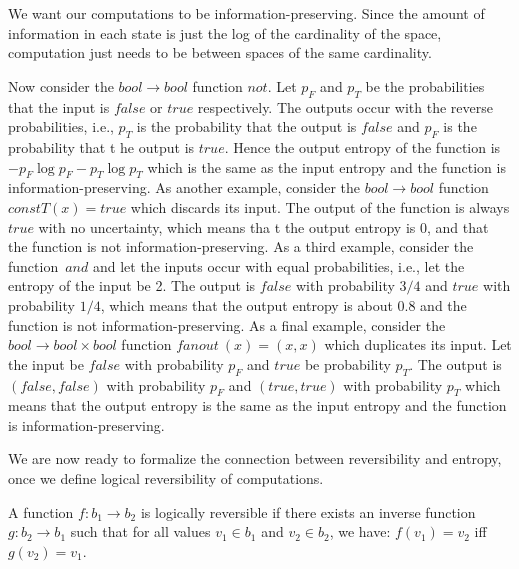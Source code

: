 We want our computations to be information-preserving. Since the
amount of information in each state is just the log of the cardinality
of the space, computation just needs to be between spaces of the same
cardinality. 

 Now consider the \ensuremath{\mathit{bool} \rightarrow \mathit{bool}}
function \ensuremath{\mathit{not}}. Let $p_F$ and $p_T$ be the
probabilities that the input is \ensuremath{\mathit{false}} or
\ensuremath{\mathit{true}} respectively. The outputs occur with the
reverse probabilities, i.e., $p_T$ is the probability that the output
is \ensuremath{\mathit{false}} and $p_F$ is the probability that t he
output is \ensuremath{\mathit{true}}. Hence the output entropy of the
function is $- p_F \log{p_F} - p_T \log{p_T}$ which is the same as the
input entropy and the function is information-preserving. As another
example, consider the \ensuremath{\mathit{bool} \rightarrow
  \mathit{bool}} function \ensuremath{\mathit{constT}(x) =
  \mathit{true}} which discards its input.  The output of the function
is always \ensuremath{\mathit{true}} with no uncertainty, which means
tha t the output entropy is 0, and that the function is not
information-preserving. As a third example, consider the
function~\ensuremath{\mathit{and}} and let the inputs occur with equal
probabilities, i.e., let the entropy of the input be 2. The output is
\ensuremath{\mathit{false}} with probability $3/4$ and
\ensuremath{\mathit{true}} with probability $1/4$, which means that
the output entropy is about 0.8 and the function is not
information-preserving. As a final example, consider the
\ensuremath{\mathit{bool} \rightarrow \mathit{bool}\times
  \mathit{bool}} function \ensuremath{\mathit{fanout} ~(x) = (x,x)}
which duplicates its input.  Let the input be
\ensuremath{\mathit{false}} with probability $p_F$ and
\ensuremath{\mathit{true}} be probability $p_T$. The output is
\ensuremath{(\mathit{false},\mathit{false})} with probability $p_F$
and \ensuremath{(\mathit{true},\mathit{true})} with probability $p_T$
which means that the output entropy is the same as the input entropy
and the function is information-preserving.

We are now ready to formalize the connection between reversibility and
entropy, once we define logical reversibility of computations. 

\begin{definition}
A function $f : b_1 \rightarrow b_2$ is logically reversible if there exists
an inverse function $g : b_2 \rightarrow b_1$ such that for all values $v_1
\in b_1$ and $v_2 \in b_2$, we have: $f(v_1) = v_2$ iff $g(v_2) = v_1$.
\end{definition}

